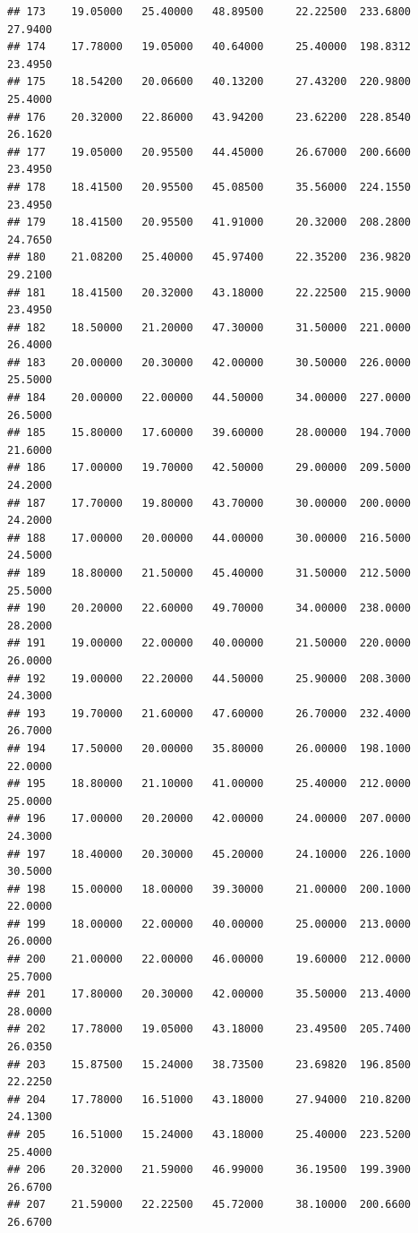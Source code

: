\documentclass[]{article}
\begin{document}
\begin{verbatim}
## 173    19.05000   25.40000   48.89500     22.22500  233.6800     27.9400
## 174    17.78000   19.05000   40.64000     25.40000  198.8312     23.4950
## 175    18.54200   20.06600   40.13200     27.43200  220.9800     25.4000
## 176    20.32000   22.86000   43.94200     23.62200  228.8540     26.1620
## 177    19.05000   20.95500   44.45000     26.67000  200.6600     23.4950
## 178    18.41500   20.95500   45.08500     35.56000  224.1550     23.4950
## 179    18.41500   20.95500   41.91000     20.32000  208.2800     24.7650
## 180    21.08200   25.40000   45.97400     22.35200  236.9820     29.2100
## 181    18.41500   20.32000   43.18000     22.22500  215.9000     23.4950
## 182    18.50000   21.20000   47.30000     31.50000  221.0000     26.4000
## 183    20.00000   20.30000   42.00000     30.50000  226.0000     25.5000
## 184    20.00000   22.00000   44.50000     34.00000  227.0000     26.5000
## 185    15.80000   17.60000   39.60000     28.00000  194.7000     21.6000
## 186    17.00000   19.70000   42.50000     29.00000  209.5000     24.2000
## 187    17.70000   19.80000   43.70000     30.00000  200.0000     24.2000
## 188    17.00000   20.00000   44.00000     30.00000  216.5000     24.5000
## 189    18.80000   21.50000   45.40000     31.50000  212.5000     25.5000
## 190    20.20000   22.60000   49.70000     34.00000  238.0000     28.2000
## 191    19.00000   22.00000   40.00000     21.50000  220.0000     26.0000
## 192    19.00000   22.20000   44.50000     25.90000  208.3000     24.3000
## 193    19.70000   21.60000   47.60000     26.70000  232.4000     26.7000
## 194    17.50000   20.00000   35.80000     26.00000  198.1000     22.0000
## 195    18.80000   21.10000   41.00000     25.40000  212.0000     25.0000
## 196    17.00000   20.20000   42.00000     24.00000  207.0000     24.3000
## 197    18.40000   20.30000   45.20000     24.10000  226.1000     30.5000
## 198    15.00000   18.00000   39.30000     21.00000  200.1000     22.0000
## 199    18.00000   22.00000   40.00000     25.00000  213.0000     26.0000
## 200    21.00000   22.00000   46.00000     19.60000  212.0000     25.7000
## 201    17.80000   20.30000   42.00000     35.50000  213.4000     28.0000
## 202    17.78000   19.05000   43.18000     23.49500  205.7400     26.0350
## 203    15.87500   15.24000   38.73500     23.69820  196.8500     22.2250
## 204    17.78000   16.51000   43.18000     27.94000  210.8200     24.1300
## 205    16.51000   15.24000   43.18000     25.40000  223.5200     25.4000
## 206    20.32000   21.59000   46.99000     36.19500  199.3900     26.6700
## 207    21.59000   22.22500   45.72000     38.10000  200.6600     26.6700

\end{verbatim}
\end{document}
